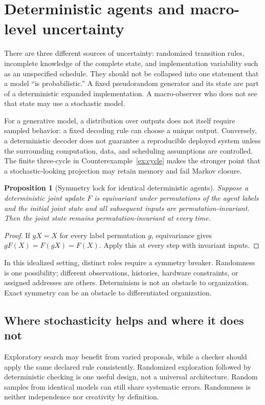 \documentclass[11pt,letterpaper]{article}
\theoremstyle{plain}
\newtheorem{proposition}{Proposition}[section]
\theoremstyle{definition}
\theoremstyle{remark}
\begin{document}
\section{Deterministic agents and macro-level uncertainty}\label{sec:determinism}
There are three different sources of uncertainty: randomized transition rules, incomplete knowledge of the complete state, and implementation variability such as an unspecified schedule. They should not be collapsed into one statement that a model ``is probabilistic.'' A fixed pseudorandom generator and its state are part of a deterministic expanded implementation. A macro-observer who does not see that state may use a stochastic model.

For a generative model, a distribution over outputs does not itself require sampled behavior: a fixed decoding rule can choose a unique output. Conversely, a deterministic decoder does not guarantee a reproducible deployed system unless the surrounding computation, data, and scheduling assumptions are controlled. The finite three-cycle in Counterexample~\ref{ex:cycle} makes the stronger point that a stochastic-looking projection may retain memory and fail Markov closure.

\begin{proposition}[Symmetry lock for identical deterministic agents]\label{prop:symmetry}
Suppose a deterministic joint update $F$ is equivariant under permutations of the agent labels and the initial joint state and all subsequent inputs are permutation-invariant. Then the joint state remains permutation-invariant at every time.
\end{proposition}
\begin{proof}
If $gX=X$ for every label permutation $g$, equivariance gives $gF(X)=F(gX)=F(X)$. Apply this at every step with invariant inputs.
\end{proof}

In this idealized setting, distinct roles require a symmetry breaker. Randomness is one possibility; different observations, histories, hardware constraints, or assigned addresses are others. Determinism is not an obstacle to organization. Exact symmetry can be an obstacle to differentiated organization.

\subsection{Where stochasticity helps and where it does not}
Exploratory search may benefit from varied proposals, while a checker should apply the same declared rule consistently. Randomized exploration followed by deterministic checking is one useful design, not a universal architecture. Random samples from identical models can still share systematic errors. Randomness is neither independence nor creativity by definition.
\end{document}
